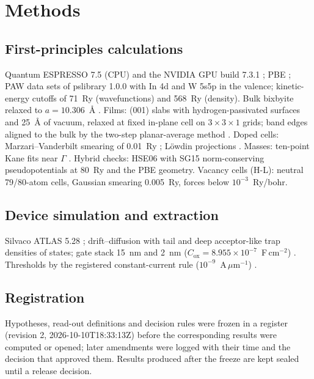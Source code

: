 \documentclass[11pt]{article}
\begin{document}
\section{Methods}
\label{sec:methods}

\subsection{First-principles calculations}
\label{sec:methods-dft}
Quantum ESPRESSO 7.5 (CPU) and the NVIDIA GPU build 7.3.1 \citep{Giannozzi2009,Giannozzi2017,NvidiaQE}; PBE
\citep{Perdew1996}; PAW data sets of pslibrary 1.0.0 \citep{Bloechl1994,DalCorso2014} with In 4d and W 5s5p in the
valence; kinetic-energy cutoffs of 71~Ry (wavefunctions) and 568~Ry (density). Bulk bixbyite \InO{} relaxed to
$a = 10.306$~\AA{} . Films: (001) slabs with hydrogen-passivated surfaces and 25~\AA{} of vacuum, relaxed at
fixed in-plane cell on $3\times3\times1$ grids; band edges aligned to the bulk by the two-step planar-average method
\citep{VandeWalle1987,Baldereschi1988}. Doped cells: Marzari--Vanderbilt smearing of 0.01~Ry \citep{Marzari1999};
L\"owdin projections \citep{Lowdin1950}. Masses: ten-point Kane fits near $\Gamma$ \citep{Kane1957}. Hybrid checks:
HSE06 \citep{Heyd2003,Krukau2006} with SG15 norm-conserving pseudopotentials \citep{Hamann2013,Schlipf2015} at 80~Ry
and the PBE geometry.
Vacancy cells (H-L): neutral 79/80-atom cells, Gaussian smearing 0.005~Ry, forces below $10^{-3}$~Ry/bohr.

\subsection{Device simulation and extraction}
\label{sec:methods-tcad}
Silvaco ATLAS 5.28 \citep{AtlasManual}; drift--diffusion with tail and deep acceptor-like trap densities of states; gate stack 15~nm \HfO{} and 2~nm
\AlO{} ($C_{\mathrm{ox}} = 8.955\times10^{-7}$~F\,cm$^{-2}$) . Thresholds by the registered constant-current
rule ($10^{-9}$~A\,$\mu$m$^{-1}$) . 

\subsection{Registration}
\label{sec:methods-registration}
Hypotheses, read-out definitions and decision rules were frozen in a register (revision 2, 2026-10-10T18:33:13Z) before
the corresponding results were computed or opened; later amendments were logged with their time and the decision that
approved them. Results produced after the freeze are kept sealed until a release decision.  
\end{document}
